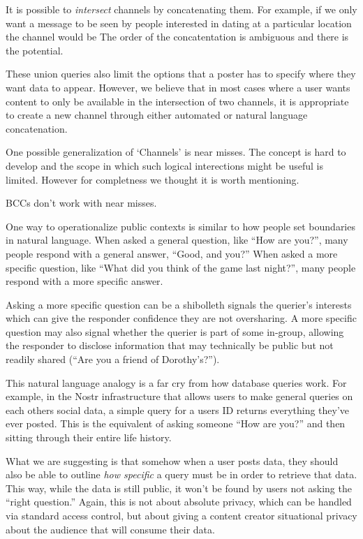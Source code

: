 It is possible to \emph{intersect} channels by concatenating them.
For example, if we only want a message to be seen by people interested in dating at a particular
location the channel would be
The order of the concatentation is ambiguous and there is the potential.

These union queries also limit the options that a poster has to specify where they want data to appear. However, we believe that in most cases where a user wants content to only be available in the intersection of two channels, it is appropriate to create a new channel through either automated or natural language concatenation.

One possible generalization of `Channels' is near misses.
The concept is hard to develop and the scope in which such logical interections
might be useful is limited. However for completness we thought it is worth mentioning.

BCCs don't work with near misses.

One way to operationalize public contexts is similar to how people set boundaries in natural language.
When asked a general question, like ``How are you?'', many people respond with a general answer, ``Good, and you?''
When asked a more specific question, like ``What did you think of the game last night?'', many people respond with a more specific answer.

Asking a more specific question can be a shibolleth
signals the querier's interests
which can give the responder confidence they are not oversharing. A more specific question may also signal whether the querier is part of some in-group, allowing the responder to disclose information that may technically be public but not readily shared (``Are you a friend of Dorothy's?'').

This natural language analogy is a far cry from how database queries work.
For example, in the Nostr infrastructure that allows users to make general queries on each others social data, a simple query for a users ID returns everything they've ever posted. This is the equivalent of asking someone ``How are you?'' and then sitting through their entire life history.

What we are suggesting is that somehow when a user posts data, they should also be able to outline \emph{how specific} a query must be in order to retrieve that data.
This way, while the data is still public, it won't be found by users not asking the ``right question.''
Again, this is not about absolute privacy, which can be handled via standard access control, but about giving a content creator situational privacy about the audience that will consume their data.

